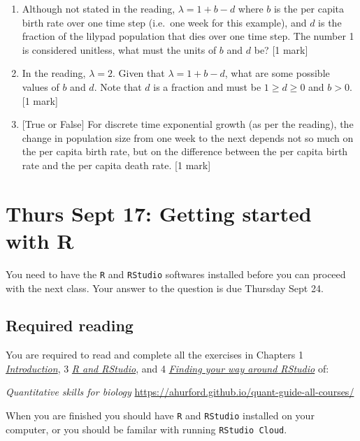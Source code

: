 \documentclass[]{book}
\begin{document}
\begin{enumerate}
\def\labelenumi{\arabic{enumi}.}
\setcounter{enumi}{6}
\item
  Although not stated in the reading, \(\lambda = 1 + b - d\) where
  \(b\) is the per capita birth rate over one time step (i.e.~one week
  for this example), and \(d\) is the fraction of the lilypad population
  that dies over one time step. The number 1 is considered unitless,
  what must the units of \(b\) and \(d\) be? {[}1 mark{]}
\item
  In the reading, \(\lambda = 2\). Given that \(\lambda = 1 + b - d\),
  what are some possible values of \(b\) and \(d\). {Note that \(d\) is
  a fraction and must be \(1 \geq d \geq 0\) and \(b>0\).} {[}1 mark{]}
\item
  {[}True or False{]} For discrete time exponential growth (as per the
  reading), the change in population size from one week to the next
  depends not so much on the per capita birth rate, but on the
  difference between the per capita birth rate and the per capita death
  rate. {[}1 mark{]}
\end{enumerate}

\chapter{Thurs Sept 17: Getting started with R}\label{Rinstall}

You need to have the \texttt{R} and \texttt{RStudio} softwares installed
before you can proceed with the next class. Your answer to the question
is due Thursday Sept 24.

\section{Required reading}\label{required-reading-1}

You are required to read and complete all the exercises in Chapters 1
\href{https://ahurford.github.io/quant-guide-all-courses/}{\emph{Introduction}},
3
\href{https://ahurford.github.io/quant-guide-all-courses/install.html}{\emph{R
and RStudio}}, and 4
\href{https://ahurford.github.io/quant-guide-all-courses/rstudio.html}{\emph{Finding
your way around RStudio}} of:

\emph{Quantitative skills for biology}
\url{https://ahurford.github.io/quant-guide-all-courses/}

When you are finished you should have \texttt{R} and \texttt{RStudio}
installed on your computer, or you should be familar with running
\texttt{RStudio\ Cloud}.
\end{document}
